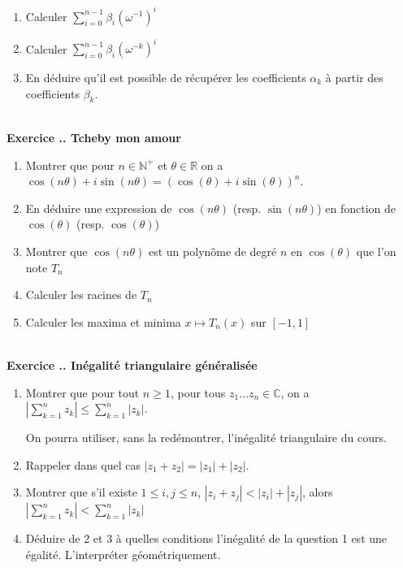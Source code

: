 \documentclass{article}
\newcommand{\mb}[1]{\mathbb{#1}}
\newcounter{exo}
\newcommand{\exercice}[1][\null]{\textbf{\\ Exercice \thesection.\theexo. #1} \addtocounter{exo}{1}}
\begin{document}
\begin{enumerate}
    \item 
        Calculer $\sum_{i = 0}^{n - 1} \beta_i (\omega^{-1})^i$
    \item 
        Calculer $\sum_{i = 0}^{n-1} \beta_i (\omega^{-k})^i$

    \item En déduire qu'il est possible de récupérer les coefficients 
        $\alpha_k$ à partir des coefficients $\beta_k$.
\end{enumerate}


\exercice[Tcheby mon amour]

\begin{enumerate}
    \item Montrer que pour $n \in \mb{N}^+$ 
        et $\theta \in \mb{R}$ on a $\cos (n\theta) + i \sin (n \theta) = (\cos
        (\theta) + i \sin (\theta))^n$.

    \item En déduire une expression de $\cos (n\theta)$ (resp. $\sin (n\theta)$)
        en fonction de $\cos (\theta)$ (resp. $\cos (\theta)$)

    \item Montrer que $\cos (n \theta)$ est un polynôme de degré $n$ en $\cos
        (\theta)$ que l'on note $T_n$

    \item Calculer les racines de $T_n$
    \item Calculer les maxima et minima $x \mapsto T_n(x)$ sur $[-1,1]$

\end{enumerate}




\exercice[Inégalité triangulaire généralisée]

\begin{enumerate}

\item Montrer que pour tout $n \ge 1$, pour tous $z_1 \dots z_n \in \mb{C}$, on a $\displaystyle \left|\sum_{k=1}^n z_k\right| \le \sum_{k=1}^n | z_k |$.

On pourra utiliser, sans la redémontrer, l'inégalité triangulaire du cours.

\item Rappeler dans quel cas $|z_1 + z_2| = |z_1| + |z_2|$.

\item Montrer que s'il existe $1 \le i,j \le n$, $|z_i + z_j| < |z_i| + |z_j|$, alors $ \left|\sum_{k=1}^n z_k\right| < \sum_{k=1}^n | z_k |$ 

\item Déduire de 2 et 3 à quelles conditions l'inégalité de la question 1 est une égalité. L'interpréter géométriquement.

\end{enumerate}
\end{document}
